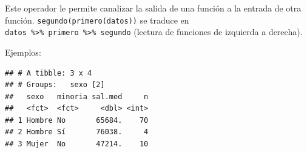 \documentclass[]{book}
\newenvironment{Shaded}{\begin{snugshade}}{\end{snugshade}}
\newcommand{\DataTypeTok}[1]{\textcolor[rgb]{0.13,0.29,0.53}{#1}}
\newcommand{\DecValTok}[1]{\textcolor[rgb]{0.00,0.00,0.81}{#1}}
\newcommand{\KeywordTok}[1]{\textcolor[rgb]{0.13,0.29,0.53}{\textbf{#1}}}
\newcommand{\NormalTok}[1]{#1}
\newcommand{\OperatorTok}[1]{\textcolor[rgb]{0.81,0.36,0.00}{\textbf{#1}}}
\newcommand{\StringTok}[1]{\textcolor[rgb]{0.31,0.60,0.02}{#1}}
\begin{document}
Este operador le permite canalizar la salida de una función a la entrada de otra función.
\texttt{segundo(primero(datos))} se traduce en \texttt{datos\ \%\textgreater{}\%\ primero\ \%\textgreater{}\%\ segundo}
(lectura de funciones de izquierda a derecha).

Ejemplos:

\begin{Shaded}
\end{Shaded}

\begin{verbatim}
## # A tibble: 3 x 4
## # Groups:   sexo [2]
##   sexo   minoria sal.med     n
##   <fct>  <fct>     <dbl> <int>
## 1 Hombre No       65684.    70
## 2 Hombre Sí       76038.     4
## 3 Mujer  No       47214.    10
\end{verbatim}

\begin{Shaded}
\end{Shaded}
\end{document}
